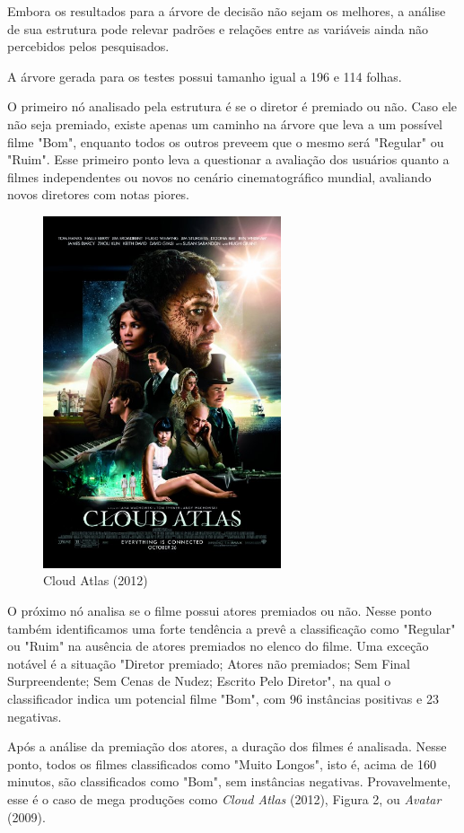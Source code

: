 \documentclass[twoside]{article}
\begin{document}
\begin{multicols}{2}
Embora os resultados para a árvore de decisão não sejam os melhores, a análise de sua estrutura pode relevar padrões e relações entre as variáveis ainda não percebidos pelos pesquisados.

A árvore gerada para os testes possui tamanho igual a 196 e 114 folhas.

O primeiro nó analisado pela estrutura é se o diretor é premiado ou não. Caso ele não seja premiado, existe apenas um caminho na árvore que leva a um possível filme "Bom", enquanto todos os outros preveem que o mesmo será "Regular" ou "Ruim". Esse primeiro ponto leva a questionar a avaliação dos usuários quanto a filmes independentes ou novos no cenário cinematográfico mundial, avaliando novos diretores com notas piores.

\begin{figure}[H]
\centering
\includegraphics[width=7cm]{cloud.jpg}
\caption{Cloud Atlas (2012)}
\label{Rotulo}
\end{figure} 

O próximo nó analisa se o filme possui atores premiados ou não. Nesse ponto também identificamos uma forte tendência a prevê a classificação como "Regular" ou "Ruim" na ausência de atores premiados no elenco do filme. Uma exceção notável é a situação "Diretor premiado; Atores não premiados; Sem Final Surpreendente; Sem Cenas de Nudez; Escrito Pelo Diretor", na qual o classificador indica um potencial filme "Bom", com 96 instâncias positivas e 23 negativas.

Após a análise da premiação dos atores, a duração dos filmes é analisada. Nesse ponto, todos os filmes classificados como "Muito Longos", isto é, acima de 160 minutos, são classificados como "Bom", sem instâncias negativas. Provavelmente, esse é o caso de mega produções como \textit{Cloud Atlas} (2012), Figura 2, ou \textit{Avatar} (2009).


\end{multicols}
\end{document}
